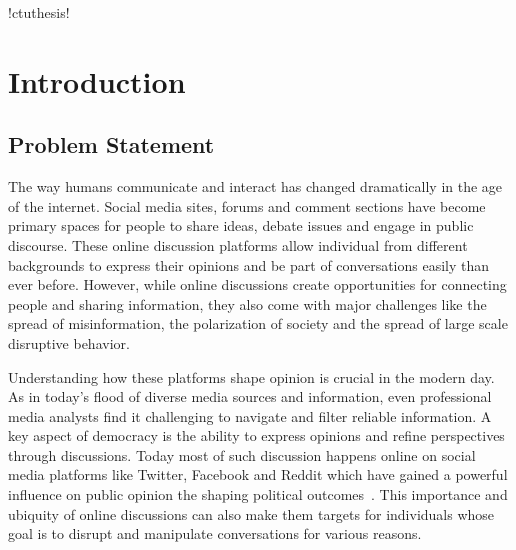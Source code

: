 \documentclass[twoside]{ctuthesis}
\theoremstyle{plain}
\theoremstyle{definition}
\theoremstyle{note}
\begin{document}
\renewcommand \ctulstsep{0pt}

\newcommand\ctuclsname{\leavevmode\unhcopy\ctuclsnamebox}
\newsavebox\ctuclsnamebox
\begin{lrbox}{\ctuclsnamebox}
\ctulst!ctuthesis!
\end{lrbox}

\maketitle

\chapter{Introduction}

\section{Problem Statement}
\par
The way humans communicate and interact has changed dramatically in the age of the internet. Social media sites, forums and comment sections have become primary spaces for people to share ideas, debate issues and engage in public discourse. These online discussion platforms allow individual from different backgrounds to express their opinions and be part of conversations easily than ever before. However, while online discussions create opportunities for connecting people and sharing information, they also come with major challenges like the spread of misinformation, the polarization of society and the spread of large scale disruptive behavior.\par

Understanding how these platforms shape opinion is crucial in the modern day. As in today's flood of diverse media sources and information, even professional media analysts find it challenging to navigate and filter reliable information. A key aspect of democracy is the ability to express opinions and refine perspectives through discussions. Today most of such discussion happens online on social media platforms like Twitter, Facebook and Reddit which have gained a powerful influence on public opinion the shaping political outcomes~\cite{Bennett2012DigitalMedia}. This importance and ubiquity of online discussions can also make them targets for individuals whose goal is to disrupt and manipulate conversations for various reasons.\par
\end{document}
